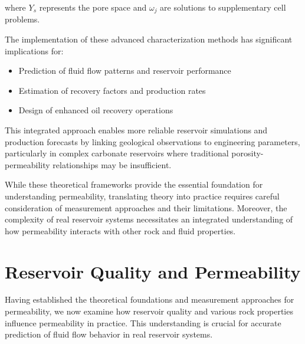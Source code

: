 \documentclass[journal]{IEEEtran}
\begin{document}
where $Y_s$ represents the pore space and $\omega_j$ are solutions to supplementary cell problems.

The implementation of these advanced characterization methods has significant implications for:
\begin{itemize}
    \item Prediction of fluid flow patterns and reservoir performance
    \item Estimation of recovery factors and production rates
    \item Design of enhanced oil recovery operations
\end{itemize}

This integrated approach enables more reliable reservoir simulations and production forecasts by linking geological observations to engineering parameters, particularly in complex carbonate reservoirs where traditional porosity-permeability relationships may be insufficient.

While these theoretical frameworks provide the essential foundation for understanding permeability, translating theory into practice requires careful consideration of measurement approaches and their limitations. Moreover, the complexity of real reservoir systems necessitates an integrated understanding of how permeability interacts with other rock and fluid properties.

\section{Reservoir Quality and Permeability}

Having established the theoretical foundations and measurement approaches for permeability, we now examine how reservoir quality and various rock properties influence permeability in practice. This understanding is crucial for accurate prediction of fluid flow behavior in real reservoir systems.
\end{document}
